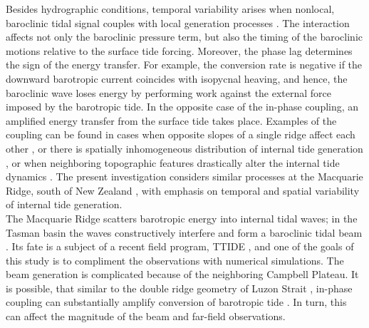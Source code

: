 \documentclass[12pt]{article}
\begin{document}
Besides hydrographic conditions, temporal variability arises when nonlocal, baroclinic tidal signal 
couples  
with local generation processes \citep{Kelly2010a, zilberman2011incoherent, 
pickering2015structure}. The interaction affects not only the baroclinic pressure term, but also 
the 
timing 
of the baroclinic motions relative to the surface tide forcing. Moreover, the phase lag determines 
the sign of the energy transfer. For example, the conversion rate is negative if the downward 
barotropic current coincides with isopycnal heaving, and hence, the baroclinic wave 
loses 
energy by performing work against the external force imposed by the barotropic tide. In the 
opposite case of the in-phase coupling, an amplified energy transfer from the surface tide takes 
place. Examples of the coupling can be found in cases when opposite slopes of a single ridge 
affect each other \citep{zilberman2011incoherent, echeverri2010internal}, or there is spatially 
inhomogeneous distribution of internal tide generation \citep{osborne2011spatial, 
ponte2013coastal}, or when neighboring topographic features drastically alter the internal tide 
dynamics \citep{xing1998three, buijsman2012modeling, klymak2013parameterizing, buijsman2014three}. 
The present investigation considers similar processes at the Macquarie Ridge, south of New Zealand 
, with emphasis on temporal and spatial variability of internal 
tide generation.\\

The Macquarie Ridge scatters barotropic energy into internal tidal waves; in the Tasman basin the 
waves constructively interfere \citep{rainville2010interference} and form a baroclinic tidal beam 
\citep{zhao2016global}. Its 
fate is a subject of a recent field program, TTIDE \citep{pinkel2015breaking}, and one of the goals 
of this study is to compliment the observations with numerical simulations. The beam generation is 
complicated because of the neighboring Campbell Plateau. It is possible, that similar to the 
double ridge geometry of Luzon Strait \citep{alford2011energy}, in-phase coupling can substantially 
amplify 
conversion of barotropic tide \citep{buijsman2012double, echeverri2010internal}. In turn, 
this can affect the magnitude of the beam and far-field observations.\\
\end{document}
